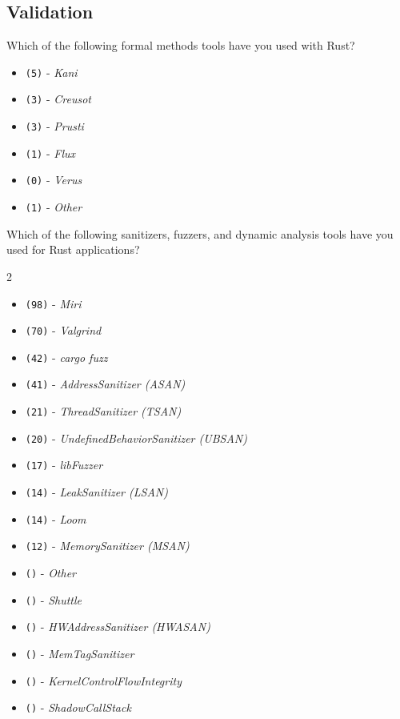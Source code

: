 \subsection{Validation}
\label{survey:sec:vq}
\begin{protocol}
\item \label{survey:vq1}  Which of the following formal methods tools have you used with Rust?
\begin{itemize}
\item \texttt{(5)} - \textit{Kani}
\item \texttt{(3)} - \textit{Creusot}
\item \texttt{(3)} - \textit{Prusti}
\item \texttt{(1)} - \textit{Flux}
\item \texttt{(0)} - \textit{Verus}
\item \texttt{(1)} - \textit{Other}
\end{itemize}
\item \label{survey:vq2}  Which of the following sanitizers, fuzzers, and dynamic analysis tools have you used for Rust applications?
\begin{multicols}{2}
\begin{itemize}
\item \texttt{(98)} - \textit{Miri}
\item \texttt{(70)} - \textit{Valgrind}
\item \texttt{(42)} - \textit{cargo fuzz}
\item \texttt{(41)} - \textit{AddressSanitizer (ASAN)}
\item \texttt{(21)} - \textit{ThreadSanitizer (TSAN)}
\item \texttt{(20)} - \textit{UndefinedBehaviorSanitizer (UBSAN)}
\item \texttt{(17)} - \textit{libFuzzer}
\item \texttt{(14)} - \textit{LeakSanitizer (LSAN)}
\item \texttt{(14)} - \textit{Loom}
\item \texttt{(12)} - \textit{MemorySanitizer (MSAN)}
\item \texttt{()} - \textit{Other}
\item \texttt{()} - \textit{Shuttle}
\item \texttt{()} - \textit{HWAddressSanitizer (HWASAN)}
\item \texttt{()} - \textit{MemTagSanitizer}
\item \texttt{()} - \textit{KernelControlFlowIntegrity}
\item \texttt{()} - \textit{ShadowCallStack}


\end{itemize}
\end{multicols}
\end{protocol}
